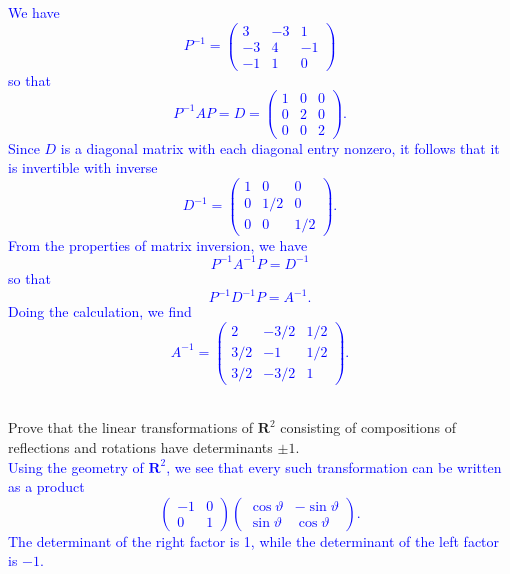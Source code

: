 \documentclass[a4paper,11pt]{article}
\newcommand{\R}{\mathbf{R}}
\newcommand{\BB}[1]{\textcolor{blue}{#1}}
\begin{document}
\BB{We have
  \[
    P^{-1} =
    \left(
      \begin{array}{rrr}
        3 & -3 & 1 \\
        -3 & 4 & -1 \\
        -1 & 1 & 0
      \end{array}
    \right)
  \]
  so that
  \[
    P^{-1}AP = D =
    \left(
      \begin{array}{rrr}
        1 & 0 & 0 \\
        0 & 2 & 0 \\
        0 & 0 & 2
      \end{array}
    \right).
  \]
  Since $D$ is a diagonal matrix with each diagonal entry nonzero, it follows
  that it is invertible with inverse
  \[
    D^{-1} =
    \left(
      \begin{array}{rrr}
        1 & 0 & 0 \\
        0 & 1/2 & 0 \\
        0 & 0 & 1/2
      \end{array}
    \right).
  \]
  From the properties of matrix inversion, we have
  \[
    P^{-1}A^{-1}P = D^{-1}
  \]
  so that
  \[
    P^{-1}D^{-1}P = A^{-1}.
  \]
  Doing the calculation, we find
  \[
    A^{-1} =
    \left(
      \begin{array}{rrr}
        2 & -3/2 & 1/2 \\
        3/2 & -1 & 1/2 \\
        3/2 & -3/2 & 1
      \end{array}
    \right).
  \] \\
}

 Prove that the linear transformations of $\R^2$
consisting of compositions of reflections and rotations have determinants $\pm
1$. \\

\BB{Using the geometry of $\R^2$, we see that every such transformation can be
  written as a product
  \[
    \left(
      \begin{array}{rr}
        -1 & 0 \\ 0 & 1
      \end{array}
    \right)
    \left(
      \begin{array}{rr}
        \cos\vartheta & -\sin\vartheta \\ \sin\vartheta & \cos\vartheta
      \end{array}
    \right).
  \]
  The determinant of the right factor is 1, while the determinant of the left
  factor is $-1$. \\}
\end{document}
